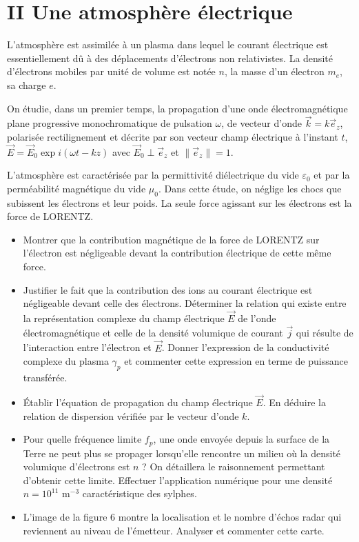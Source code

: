 \section*{II Une atmosphère électrique}

L'atmosphère est assimilée à un plasma dans lequel le courant électrique est essentiellement dû à des déplacements d'électrons non relativistes. La densité d'électrons mobiles par unité de volume est notée $n$, la masse d'un électron $m_e$, sa charge $e$.

On étudie, dans un premier temps, la propagation d'une onde électromagnétique plane progressive monochromatique de pulsation $\omega$, de vecteur d'onde $\vec{k} = k\vec{e}_z$, polarisée rectilignement et décrite par son vecteur champ électrique à l'instant $t$, $\vec{E} = \vec{E}_0 \exp i(\omega t - kz)$ avec $\vec{E}_0 \perp \vec{e}_z$ et $\|\vec{e}_z\| = 1$.

L'atmosphère est caractérisée par la permittivité diélectrique du vide $\varepsilon_0$ et par la perméabilité magnétique du vide $\mu_0$. Dans cette étude, on néglige les chocs que subissent les électrons et leur poids. La seule force agissant sur les électrons est la force de LORENTZ.

\begin{itemize}
    \item[13.] Montrer que la contribution magnétique de la force de LORENTZ sur l'électron est négligeable devant la contribution électrique de cette même force.
    \item[14.] Justifier le fait que la contribution des ions au courant électrique est négligeable devant celle des électrons. Déterminer la relation qui existe entre la représentation complexe du champ électrique $\vec{E}$ de l'onde électromagnétique et celle de la densité volumique de courant $\vec{j}$ qui résulte de l'interaction entre l'électron et $\vec{E}$. Donner l'expression de la conductivité complexe du plasma $\gamma_p$ et commenter cette expression en terme de puissance transférée.
    \item[15.] Établir l'équation de propagation du champ électrique $\vec{E}$. En déduire la relation de dispersion vérifiée par le vecteur d'onde $k$.
    \item[16.] Pour quelle fréquence limite $f_p$, une onde envoyée depuis la surface de la Terre ne peut plus se propager lorsqu'elle rencontre un milieu où la densité volumique d'électrons est $n$ ? On détaillera le raisonnement permettant d'obtenir cette limite. Effectuer l'application numérique pour une densité $n = 10^{11}\text{ m}^{-3}$ caractéristique des sylphes.
    \item[17.] L'image de la figure 6 montre la localisation et le nombre d'échos radar qui reviennent au niveau de l'émetteur. Analyser et commenter cette carte.
\end{itemize}


